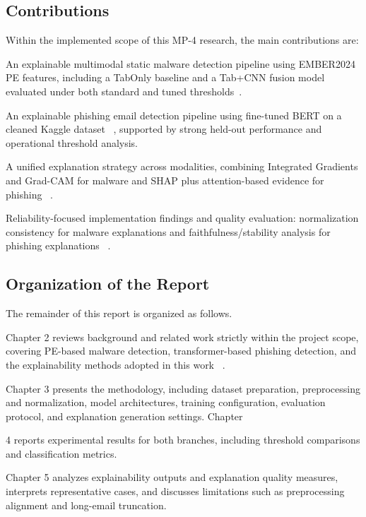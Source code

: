 \documentclass[conference]{IEEEtran}
\begin{document}
\subsection{Contributions}

Within the implemented scope of this MP-4 research, the main contributions are:

An explainable multimodal static malware detection pipeline using EMBER2024 PE features, including a TabOnly baseline and a Tab+CNN fusion model evaluated under both standard and tuned thresholds~\cite{JMGPR2024}.

An explainable phishing email detection pipeline using fine-tuned BERT on a cleaned Kaggle dataset~\cite{JMKK2019} \cite{phishingDT}, supported by strong held-out performance and operational threshold analysis.

A unified explanation strategy across modalities, combining Integrated Gradients and Grad-CAM for malware and SHAP plus attention-based evidence for phishing~\cite{SCDVPB2017} \cite{MAQ2017} \cite{LL2017} \cite{JW2019}.

Reliability-focused implementation findings and quality evaluation: normalization consistency for malware explanations and faithfulness/stability analysis for phishing explanations~\cite{MAQ2017} \cite{LL2017} \cite{JW2019}.

\subsection{Organization of the Report}

The remainder of this report is organized as follows.

Chapter 2 reviews background and related work strictly within the project scope, covering PE-based malware detection, transformer-based phishing detection, and the explainability methods adopted in this work~\cite{JMGPR2024} \cite{SCDVPB2017} \cite{MAQ2017} \cite{LL2017} \cite{JMKK2019} \cite{JW2019}.

Chapter 3 presents the methodology, including dataset preparation, preprocessing and normalization, model architectures, training configuration, evaluation protocol, and explanation generation settings. Chapter

4 reports experimental results for both branches, including threshold comparisons and classification metrics.

Chapter 5 analyzes explainability outputs and explanation quality measures, interprets representative cases, and discusses limitations such as preprocessing alignment and long-email truncation.
\end{document}
